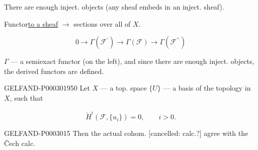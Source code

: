  There are enough inject. objects
(any sheaf embeds in an inject. sheaf).





Functor\quad\underline{to a sheaf} $\longrightarrow$ sections over all of $X$.

\begin{equation*}0\longrightarrow\Gamma (\mathcal F^{\prime})\longrightarrow\Gamma (\mathcal F)\longrightarrow\Gamma (\mathcal F^{\prime\prime})\end{equation*}

$\Gamma$ --- a semiexact functor (on the left), and since there are enough inject. objects,
the derived functors are defined.

\begin{GelfandAdjacentEvidence}{GELFAND-P000301}{950}
Let $X$ --- a top. space $\{U\}$ --- a basis of the topology in $X$,
such that

\begin{equation*}\check H^i (\mathcal F,\{u_i\})=0,\qquad i>0.\end{equation*}\end{GelfandAdjacentEvidence}

\begin{GelfandAdjacentEvidence}{GELFAND-P000301}{5}
Then the actual cohom. [cancelled: calc.?] agree with the Čech calc.

\end{GelfandAdjacentEvidence}



